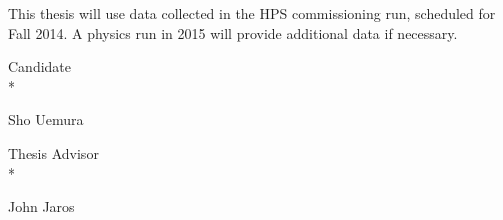 \documentclass[12pt,letterpaper]{article}
\begin{document}
This thesis will use data collected in the HPS commissioning run, scheduled for Fall 2014. A physics run in 2015 will provide additional data if necessary.




\vspace{1 cm}
\par\noindent Candidate\dotfill\null\\*
  {\raggedleft Sho Uemura\par}

\vspace{1 cm}
\par\noindent Thesis Advisor\dotfill\null\\*
  {\raggedleft John Jaros\par}
\end{document}
